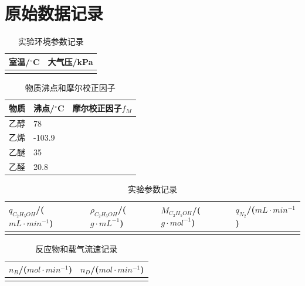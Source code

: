 \documentclass[a4paper]{article}
\begin{document}
\section{原始数据记录}
\begin{table}[H]
	\begin{center}
		\begin{tabular}{l|l}
			\hline
			室温/$^\circ$C & 大气压/kPa\\
			\hline
						   &           \\
			\hline
		 \end{tabular}
	\end{center}
	\caption{实验环境参数记录}
\end{table}
\begin{table}[H]
	\begin{center}
		\begin{tabular}{l|l|l}
			\hline
			物质& 沸点/$^\circ$C & 摩尔校正因子$f_{M}$\\
			\hline
			乙醇&   78      &	\\
			\hline
			乙烯&  -103.9   &	\\
			\hline
			乙醚&  35       &	\\
			\hline
			乙醛&  20.8     &	\\
			\hline
		 \end{tabular}
	\end{center}
	\caption{物质沸点和摩尔校正因子}
\end{table}
\begin{table}[H]
	\begin{center}
		\begin{tabular}{l|l|l|l}
			\hline
			$q_{C_{2}H_{5}OH}$/($mL\cdot min^{-1}$) & $\rho_{C_{2}H_{5}OH}$/($g\cdot mL^{-1}$) 
			& $M_{C_{2}H_{5}OH}$/($g\cdot mol^{-1}$) & $q_{N_{2}}$/($mL\cdot min^{-1}$)\\
			\hline
						                            &                                          
			&                                       &                                  \\
			\hline
			
		 \end{tabular}
	\end{center}
	\caption{实验参数记录}
\end{table}
\begin{table}[H]
	\begin{center}
		\begin{tabular}{l|l}
			\hline
			$n_{B}$/($mol\cdot min^{-1}$) & $n_{D}$/($mol\cdot min^{-1}$)\\
			\hline
			                              &                              \\
			\hline
		 \end{tabular}
	\end{center}
	\caption{反应物和载气流速记录}
\end{table}
\end{document}
